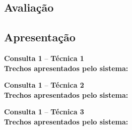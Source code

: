 \documentclass{article}
\newcommand{\resultsheader}[2] {
	\noindent \textbf{Consulta #1} -- \textbf{Técnica #2}
	 \vspace{0.5 cm} \\
	\noindent \textbf{Trechos apresentados pelo sistema:}
}
\begin{document}
\pagestyle{empty}

\begin{center}
\section*{Avaliação}
\end{center}
\vspace{1cm}


\subsection*{Apresentação}



\newpage \resultsheader{1}{1}
 
\newpage \resultsheader{1}{2}
 	
\newpage \resultsheader{1}{3}
 	

%  
%  	
%  	
\end{document}
